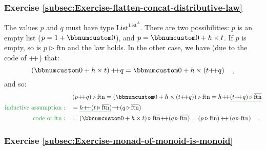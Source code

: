 \subsubsection*{Exercise \ref{subsec:Exercise-flatten-concat-distributive-law}}

The values $p$ and $q$ must have type $\text{List}^{\text{List}^{A}}$.
There are two possibilities: $p$ is an empty list ($p=1+\bbnum 0$),
and $p=\bbnum 0+h\times t$. If $p$ is empty, so is $p\triangleright\text{ftn}$
and the law holds. In the other case, we have (due to the code of
${\displaystyle }{+\negmedspace+}$) that:
\[
\left(\bbnum 0+h\times t\right)\pplus q=\bbnum 0+h\times\left(t\pplus q\right)\quad,
\]
and so:
\begin{align*}
 & \left(p\pplus q\right)\triangleright\text{ftn}=\left(\bbnum 0+h\times\left(t\pplus q\right)\right)\triangleright\text{ftn}=h\pplus\gunderline{\left(t\pplus q\right)\triangleright\overline{\text{ftn}}}\\
{\color{greenunder}\text{inductive assumption}:}\quad & =\gunderline{h\pplus(t\triangleright\overline{\text{ftn}})}\pplus(q\triangleright\overline{\text{ftn}})\\
{\color{greenunder}\text{code of }\text{ftn}:}\quad & =\left(\bbnum 0+h\times t\right)\triangleright\overline{\text{ftn}}\pplus(q\triangleright\overline{\text{ftn}})=\left(p\triangleright\text{ftn}\right)\pplus\left(q\triangleright\text{ftn}\right)\quad.
\end{align*}


\subsubsection*{Exercise \ref{subsec:Exercise-monad-of-monoid-is-monoid}}

